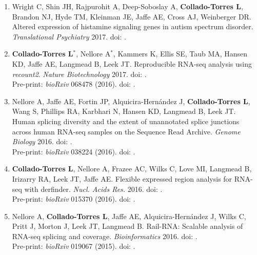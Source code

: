 \begin{enumerate}
        \item Wright C, Shin JH, Rajpurohit A, Deep-Soboslay A, \textbf{Collado-Torres L}, Brandon NJ, Hyde TM, Kleinman JE, Jaffe AE, Cross AJ, Weinberger DR. Altered expression of histamine signaling genes in autism spectrum disorder. \emph{Translational Psychiatry} 2017. doi: .
        
        \item \textbf{Collado-Torres L}$^{*}$, Nellore A$^{*}$, Kammers K, Ellis SE, Taub MA, Hansen KD, Jaffe AE, Langmead B, Leek JT. Reproducible RNA-seq analysis using \emph{recount2}. \emph{Nature Biotechnology} 2017. doi: .
        \\ Pre-print: \emph{bioRxiv} 068478 (2016). doi: .
        
        \item Nellore A, Jaffe AE, Fortin JP, Alquicira-Hernández J, \textbf{Collado-Torres L}, Wang S, Phillips RA, Karbhari N, Hansen KD, Langmead B, Leek JT. Human splicing diversity and the extent of unannotated splice junctions across human RNA-seq samples on the Sequence Read Archive. \emph{Genome Biology} 2016. doi: .
        \\ Pre-print: \emph{bioRxiv} 038224 (2016). doi: .
        
        \item \textbf{Collado-Torres L}, Nellore A, Frazee AC, Wilks C, Love MI, Langmead B, Irizarry RA, Leek JT, Jaffe AE. Flexible expressed region analysis for RNA-seq with derfinder. \emph{Nucl. Acids Res.} 2016. doi: .
        \\ Pre-print: \emph{bioRxiv} 015370 (2016). doi: .
        
        \item Nellore A, \textbf{Collado-Torres L}, Jaffe AE, Alquicira-Hernández J, Wilks C, Pritt J, Morton J, Leek JT, Langmead B. Rail-RNA: Scalable analysis of RNA-seq splicing and coverage. \emph{Bioinformatics} 2016. doi: .
        \\ Pre-print: \emph{bioRxiv} 019067 (2015). doi: .
        

\end{enumerate}
